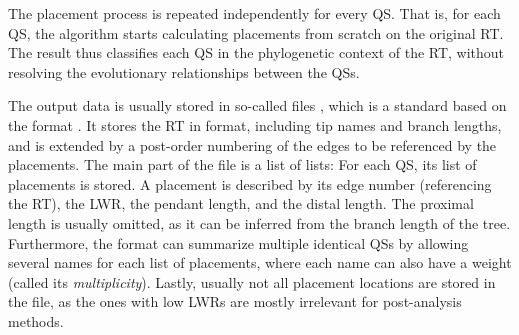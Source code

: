 The placement process is repeated independently for every \ac{QS}.
That is, for each \ac{QS}, the algorithm starts calculating placements from scratch on the original \ac{RT}.
The result thus classifies each \ac{QS} in the phylogenetic context of the \ac{RT},
without resolving the evolutionary relationships between the \acp{QS}.

The output data is usually stored in so-called  files \cite{Matsen2012},
which is a standard based on the  format \cite{JsonMemo,JsonStandard}.
It stores the \ac{RT} in  format, including tip names and branch lengths,
and is extended by a post-order numbering of the edges to be referenced by the placements.
The main part of the file is a list of lists:
For each \ac{QS}, its list of placements is stored.
A placement is described by its edge number (referencing the \ac{RT}),
the \ac{LWR}, the pendant length, and the distal length.
The proximal length is usually omitted, as it can be inferred from the branch length of the tree.
Furthermore, the format can summarize multiple identical \acp{QS}
by allowing several names for each list of placements,
where each name can also have a weight (called its \emph{multiplicity}).
Lastly, usually not all placement locations are stored in the file,
as the ones with low \acp{LWR} are mostly irrelevant for post-analysis methods.




